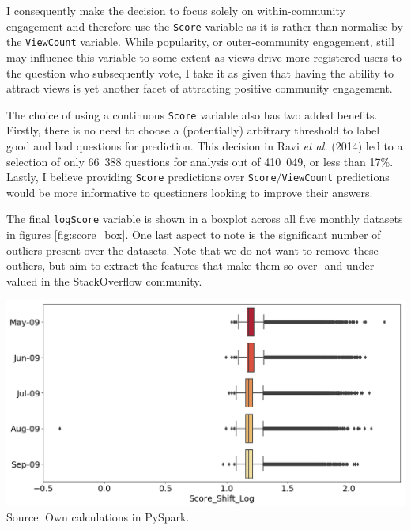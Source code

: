 \documentclass[11pt,preprint, authoryear]{article}
\let\origfigure\figure
\let\endorigfigure\endfigure
\renewenvironment{figure}[1][2] {
    \expandafter\origfigure\expandafter[H]
} {
    \endorigfigure
}
\begin{document}
I consequently make the decision to focus solely on within-community
engagement and therefore use the \texttt{Score} variable as it is rather
than normalise by the \texttt{ViewCount} variable. While popularity, or
outer-community engagement, still may influence this variable to some
extent as views drive more registered users to the question who
subsequently vote, I take it as given that having the ability to attract
views is yet another facet of attracting positive community engagement.

The choice of using a continuous \texttt{Score} variable also has two
added benefits. Firstly, there is no need to choose a (potentially)
arbitrary threshold to label good and bad questions for prediction. This
decision in Ravi \emph{et al.} (2014) led to a selection of only 66~388
questions for analysis out of 410~049, or less than 17\%. Lastly, I
believe providing \texttt{Score} predictions over
\texttt{Score}/\texttt{ViewCount} predictions would be more informative
to questioners looking to improve their answers.

The final \texttt{logScore} variable is shown in a boxplot across all
five monthly datasets in figures \ref{fig:score_box}. One last aspect to
note is the significant number of outliers present over the datasets.
Note that we do not want to remove these outliers, but aim to extract
the features that make them so over- and under-valued in the
StackOverflow community.

\footnotesize

\begin{figure}
\caption{\textbf{logScore Variable Box Plot}}
\label{fig:score_box}
\begin{minipage}{1\textwidth}

\includegraphics[width=1\linewidth]{../../01-python-code/00-workspace/01-eda/01-graphs/score_shift_log-box-plot} 
\\ \centering
{\footnotesize Source: Own calculations in PySpark.}
\end{minipage}
\end{figure}
\end{document}
